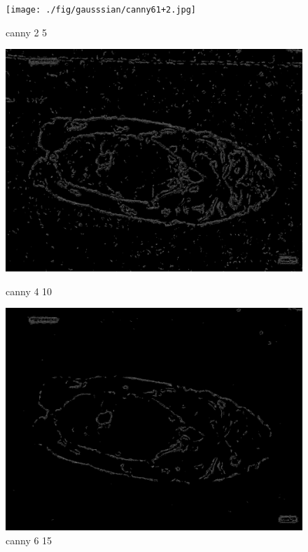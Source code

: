 \begin{figure}
    \centering
    \begin{minipage}{0.32\textwidth}
        \centering
        \texttt{[image: ./fig/gausssian/canny61+2.jpg]}
        \caption{canny 2 5}
        \label{fig:canny2_5}
    \end{minipage}
    \begin{minipage}{0.32\textwidth}
        \centering
        \includegraphics[width=\textwidth]{./fig/gausssian/canny61+4.jpg}
        \caption{canny 4 10}
        \label{fig:canny4_10}
    \end{minipage}
    \begin{minipage}{0.32\textwidth}
        \centering
        \includegraphics[width=\textwidth]{./fig/gausssian/canny61+6.jpg}
        \caption{canny 6 15}
        \label{fig:canny6_15}
    \end{minipage}
\end{figure}


